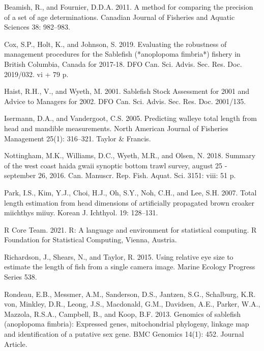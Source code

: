 \documentclass[12pt]{article}\usepackage[]{graphicx}\usepackage[]{color}
\begin{document}
\hypertarget{refs}{}
\begin{CSLReferences}{1}{0}
%
Beamish, R., and Fournier, D.D.A. 2011. A method for comparing the precision of a set of age determinations. Canadian Journal of Fisheries and Aquatic Sciences 38: 982--983.

%
Cox, S.P., Holt, K., and Johnson, S. 2019. Evaluating the robustness of management procedures for the {Sablefish} (*anoplopoma fimbria*) fishery in {British Columbia, Canada} for 2017-18. DFO Can. Sci. Advis. Sec. Res. Doc. 2019/032. vi + 79 p.

%
Haist, R.H., V., and Wyeth, M. 2001. Sablefish {Stock Assessment} for 2001 and {Advice to Managers} for 2002. DFO Can. Sci. Advis. Sec. Res. Doc. 2001/135.

%
Isermann, D.A., and Vandergoot, C.S. 2005. Predicting walleye total length from head and mandible measurements. North American Journal of Fisheries Management 25(1): 316--321. Taylor \& Francis.

%
Nottingham, M.K., Williams, D.C., Wyeth, M.R., and Olsen, N. 2018. Summary of the west coast haida gwaii synoptic bottom trawl survey, august 25 - september 26, 2016. Can. Manuscr. Rep. Fish. Aquat. Sci. 3151: viii: 51 p.

%
Park, I.S., Kim, Y.J., Choi, H.J., Oh, S.Y., Noh, C.H., and Lee, S.H. 2007. Total length estimation from head dimensions of artificially propagated brown croaker miichthys miiuy. Korean J. Ichthyol. 19: 128--131.

%
R Core Team. 2021. R: A language and environment for statistical computing. R Foundation for Statistical Computing, Vienna, Austria.

%
Richardson, J., Shears, N., and Taylor, R. 2015. Using relative eye size to estimate the length of fish from a single camera image. Marine Ecology Progress Series 538.

%
Rondeau, E.B., Messmer, A.M., Sanderson, D.S., Jantzen, S.G., Schalburg, K.R. von, Minkley, D.R., Leong, J.S., Macdonald, G.M., Davidsen, A.E., Parker, W.A., Mazzola, R.S.A., Campbell, B., and Koop, B.F. 2013. Genomics of sablefish (anoplopoma fimbria): Expressed genes, mitochondrial phylogeny, linkage map and identification of a putative sex gene. BMC Genomics 14(1): 452. Journal Article.


\end{CSLReferences}
\end{document}
